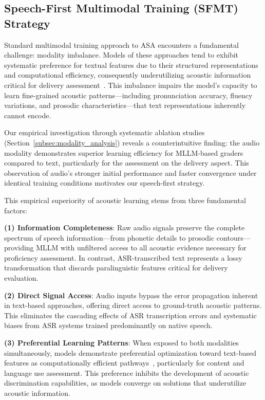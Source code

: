 \documentclass[conference]{IEEEtran}
\begin{document}
\subsection{Speech-First Multimodal Training (SFMT) Strategy}

Standard multimodal training approach to ASA encounters a fundamental challenge: modality imbalance. Models of these approaches tend to exhibit systematic preference for textual features due to their structured representations and computational efficiency, consequently underutilizing acoustic information critical for delivery assessment~\cite{modality_imbalance2023cvpr}. This imbalance impairs the model's capacity to learn fine-grained acoustic patterns—including pronunciation accuracy, fluency variations, and prosodic characteristics—that text representations inherently cannot encode.

Our empirical investigation through systematic ablation studies (Section~\ref{subsec:modality_analysis}) reveals a counterintuitive finding: the audio modality demonstrates superior learning efficiency for MLLM-based graders compared to text, particularly for the assessment on the delivery aspect. This observation of audio's stronger initial performance and faster convergence under identical training conditions motivates our speech-first strategy.

This empirical superiority of acoustic learning stems from three fundamental factors:

\textbf{(1) Information Completeness}: Raw audio signals preserve the complete spectrum of speech information—from phonetic details to prosodic contours—providing MLLM with unfiltered access to all acoustic evidence necessary for proficiency assessment. In contrast, ASR-transcribed text represents a lossy transformation that discards paralinguistic features critical for delivery evaluation.

\textbf{(2) Direct Signal Access}: Audio inputs bypass the error propagation inherent in text-based approaches, offering direct access to ground-truth acoustic patterns. This eliminates the cascading effects of ASR transcription errors and systematic biases from ASR systems trained predominantly on native speech.

\textbf{(3) Preferential Learning Patterns}: When exposed to both modalities simultaneously, models demonstrate preferential optimization toward text-based features as computationally efficient pathways~\cite{yu2024emnlp}, particularly for content and language use assessment. This preference inhibits the development of acoustic discrimination capabilities, as models converge on solutions that underutilize acoustic information.
\end{document}
